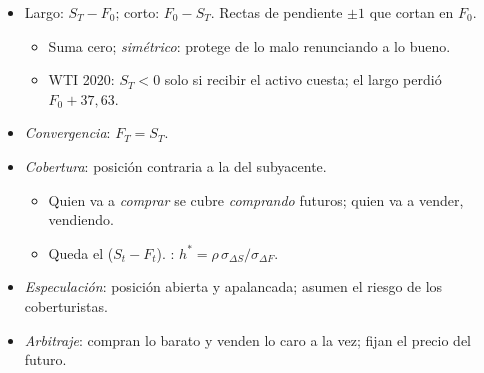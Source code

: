 \documentclass{article}
\begin{document}
\begin{columnas}
\begin{itemize}
\item Largo: $S_T-F_0$; corto: $F_0-S_T$. Rectas de pendiente $\pm1$ que cortan en $F_0$.
  \begin{itemize}
  \item Suma cero; \emph{simétrico}: protege de lo malo renunciando a lo bueno.
  \item WTI 2020: $S_T<0$ solo si recibir el activo cuesta; el largo perdió $F_0+37{,}63$.
  \end{itemize}
\item \emph{Convergencia}: $F_T=S_T$.
\end{itemize}

\begin{itemize}
\item \emph{Cobertura}: posición contraria a la del subyacente.
  \begin{itemize}
  \item Quien va a \emph{comprar} se cubre \emph{comprando} futuros; quien va a vender, vendiendo.
  \item Queda el  ($S_t-F_t$). : $h^{*}=\rho\,\sigma_{\Delta S}/\sigma_{\Delta F}$.
  \end{itemize}
\item \emph{Especulación}: posición abierta y apalancada; asumen el riesgo de los coberturistas.
\item \emph{Arbitraje}: compran lo barato y venden lo caro a la vez; fijan el precio del futuro.
\end{itemize}


\end{columnas}
\end{document}
